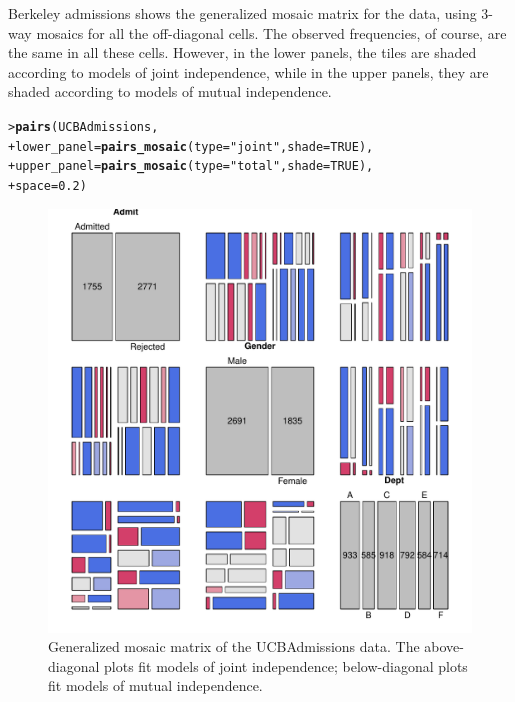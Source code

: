 \documentclass[10pt,krantz2]{krantz}\usepackage[]{graphicx}\usepackage[]{color}
\makeatletter
\newcommand{\hlnum}[1]{\textcolor[rgb]{0.686,0.059,0.569}{#1}}%
\newcommand{\hlstr}[1]{\textcolor[rgb]{0.192,0.494,0.8}{#1}}%
\newcommand{\hlstd}[1]{\textcolor[rgb]{0.345,0.345,0.345}{#1}}%
\newcommand{\hlkwc}[1]{\textcolor[rgb]{0.333,0.667,0.333}{#1}}%
\newcommand{\hlkwd}[1]{\textcolor[rgb]{0.737,0.353,0.396}{\textbf{#1}}}%
\newenvironment{kframe}{%
 \def\at@end@of@kframe{}%
 \ifinner\ifhmode%
  \def\at@end@of@kframe{\end{minipage}}%
  \begin{minipage}{\columnwidth}%
 \fi\fi%
 \def\FrameCommand##1{\hskip\@totalleftmargin \hskip-\fboxsep
 \colorbox{shadecolor}{##1}\hskip-\fboxsep
     \hskip-\linewidth \hskip-\@totalleftmargin \hskip\columnwidth}%
 \MakeFramed {\advance\hsize-\width
   \@totalleftmargin\z@ \linewidth\hsize
   \@setminipage}}%
 {\par\unskip\endMakeFramed%
 \at@end@of@kframe}
\newenvironment{knitrout}{}{} %
\renewenvironment{knitrout}{\small\renewcommand{\baselinestretch}{.85}}{} %
\makeatother
\begin{document}
\begin{Example}[berkeley4b]{Berkeley admissions}
 shows the generalized mosaic matrix for the 
data, using 3-way mosaics for all the off-diagonal cells.
The observed frequencies, of course, are the same in all these cells.
However, in the lower panels, the tiles are shaded according to models of
joint independence, while in the upper panels, they are shaded according to
models of mutual independence.
\begin{knitrout}
\color{fgcolor}\begin{kframe}
\begin{alltt}
\hlstd{> }\hlkwd{pairs}\hlstd{(UCBAdmissions,}
\hlstd{+ }      \hlkwc{lower_panel} \hlstd{=} \hlkwd{pairs_mosaic}\hlstd{(}\hlkwc{type} \hlstd{=} \hlstr{"joint"}\hlstd{,} \hlkwc{shade} \hlstd{=} \hlnum{TRUE}\hlstd{),}
\hlstd{+ }      \hlkwc{upper_panel} \hlstd{=} \hlkwd{pairs_mosaic}\hlstd{(}\hlkwc{type} \hlstd{=} \hlstr{"total"}\hlstd{,} \hlkwc{shade} \hlstd{=} \hlnum{TRUE}\hlstd{),}
\hlstd{+ }      \hlkwc{space}\hlstd{=}\hlnum{0.2}\hlstd{)}
\end{alltt}
\end{kframe}\begin{figure}[!htb]

\centerline{\includegraphics[width=.8\textwidth]{ch05/fig/berk-pairs2-1} }

\caption[Generalized mosaic matrix of the UCBAdmissions data]{Generalized mosaic matrix of the UCBAdmissions data. The above-diagonal plots fit models of joint independence; below-diagonal plots fit models of mutual independence.\label{fig:berk-pairs2}}
\end{figure}



\end{knitrout}
\end{Example}
\end{document}
